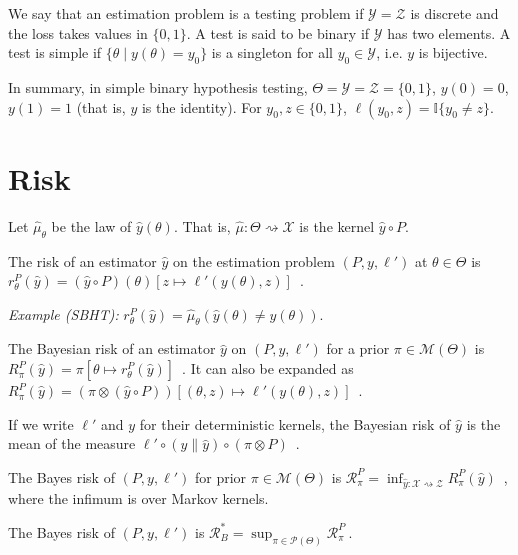 We say that an estimation problem is a testing problem if $\mathcal Y = \mathcal Z$ is discrete and the loss takes values in $\{0, 1\}$.
A test is said to be binary if $\mathcal Y$ has two elements.
A test is simple if $\{\theta \mid y(\theta) = y_0\}$ is a singleton for all $y_0 \in \mathcal Y$, i.e. $y$ is bijective.

In summary, in simple binary hypothesis testing, $\Theta = \mathcal Y = \mathcal Z = \{0,1\}$, $y(0) = 0$, $y(1) = 1$ (that is, $y$ is the identity). For $y_0, z \in \{0,1\}$, $\ell(y_0, z) = \mathbb{I}\{y_0 \ne z\}$.

\section{Risk}

Let $\hat{\mu}_\theta$ be the law of $\hat{y}(\theta)$. That is, $\hat{\mu} : \mathcal \Theta \rightsquigarrow \mathcal X$ is the kernel $\hat{y} \circ P$.

\begin{definition}[Risk]
  \label{def:risk}
  \mathlibok
  The risk of an estimator $\hat{y}$ on the estimation problem $(P, y, \ell')$ at $\theta \in \Theta$ is $r^P_\theta(\hat{y}) = (\hat{y} \circ P)(\theta)\left[z \mapsto \ell'(y(\theta), z)\right]$~.
\end{definition}

\emph{Example (SBHT):} $r^P_\theta(\hat{y}) = \hat{\mu}_\theta(\hat{y}(\theta) \ne y(\theta))$.


\begin{definition}
  \label{def:bayesianRisk}
  \mathlibok
  The Bayesian risk of an estimator $\hat{y}$ on $(P, y, \ell')$ for a prior $\pi \in \mathcal M(\Theta)$ is $R^P_\pi(\hat{y}) = \pi\left[\theta \mapsto r^P_\theta(\hat{y})\right]$~. It can also be expanded as $R^P_\pi(\hat{y}) = (\pi \otimes (\hat{y} \circ P))\left[ (\theta, z) \mapsto \ell'(y(\theta), z) \right]$~.
\end{definition}

If we write $\ell'$ and $y$ for their deterministic kernels, the Bayesian risk of $\hat{y}$ is the mean of the measure $\ell' \circ (y \parallel \hat{y}) \circ (\pi \otimes P)$~.


\begin{definition}
  \label{def:bayesRisk}
  \mathlibok
  The Bayes risk of $(P, y, \ell')$ for prior $\pi \in \mathcal M(\Theta)$ is $\mathcal R^P_\pi = \inf_{\hat{y} : \mathcal X \rightsquigarrow \mathcal Z} R^P_\pi(\hat{y})$~, where the infimum is over Markov kernels.

  The Bayes risk of $(P, y, \ell')$ is $\mathcal R^*_B = \sup_{\pi \in \mathcal P(\Theta)} \mathcal R^P_\pi \: .$
\end{definition}

